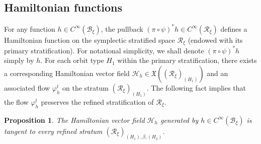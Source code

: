 \documentclass[12pt]{amsart}
\newtheorem{proposition}[theorem]{Proposition}
\theoremstyle{definition}
\numberwithin{equation}{section}
\newcommand{\Hamiltonian}[1]{\mathcal{H}_{#1}}
\newcommand{\Cinf}{C^\infty}
\newcommand{\Reducedxi}{\mathcal{R}_\xi}
\newcommand{\Bxi}{\mathcal{B}_{\xi}}
\begin{document}
	
	\subsection{Hamiltonian functions} 
 
For any function $h \in \Cinf(\Bxi)$, the pullback $(\pi \circ \psi)^*h \in \Cinf(\Reducedxi)$ defines a Hamiltonian function on the symplectic stratified space $\Reducedxi$ (endowed with its primary  stratification). For notational simplicity, we shall denote $(\pi \circ \psi)^*h$ simply by $h$. For each orbit type $H_1$ within the primary stratification, there exists a corresponding Hamiltonian vector field $\Hamiltonian{h} \in \mathfrak{X}((\Reducedxi)_{(H_1)})$ and an associated flow $\varphi_h^t$ on the stratum $(\Reducedxi)_{(H_1)}$. The following fact implies that    the flow $\varphi_h^t$ preserves the refined stratification of $\Reducedxi$. 
\begin{proposition}\label{Prop:tangenttorefinedstrata}
  The Hamiltonian vector field $\Hamiltonian{h}$ generated by $h \in \Cinf(\Bxi)$ is tangent to every refined stratum $(\Reducedxi)_{(H_1),\beta,(H_2)}$.

\end{proposition} 
\end{document}
